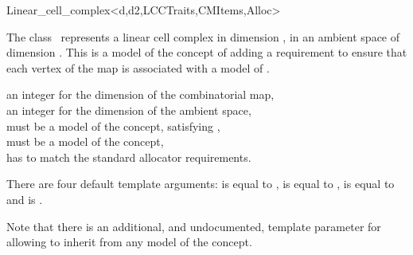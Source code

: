 \ccRefPageBegin
\begin{ccRefClass}{Linear_cell_complex<d,d2,LCCTraits,CMItems,Alloc>}


\ccDefinition
  
The class \ccRefName\ represents a linear cell complex in dimension ,
in an ambient space of dimension . This is a model of the concept of
 adding a requirement to ensure that
each vertex of the map is associated with a
model of .

\ccIsModel
{}

\ccInheritsFrom
{}

\ccParameters
{} an integer for the dimension of the combinatorial map,\\
 an integer for the dimension of the ambient space,\\
 must be a model of the  concept, satisfying ,\\
 must be a model of the  concept,\\
 has to match the standard allocator requirements. 

There are four default template arguments:
 is equal to ,
 is equal to ,
 is equal to  and
 is .

\begin{ccAdvanced}
  Note that there is an additional, and undocumented, template
  parameter  for
   allowing
  to inherit from any model of the  concept.
\end{ccAdvanced}


\end{ccRefClass}
